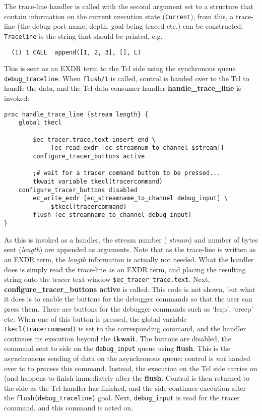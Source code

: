 The trace-line handler is called with the second argument set to a
structure that contain information on the current execution state
(\verb'Current'), from this, a trace-line (the debug port name, depth, goal
being traced etc.) can be constructed: \verb'Traceline' is the string that
should be printed, e.g.

\begin{verbatim}
  (1) 1 CALL  append([1, 2, 3], [], L)
\end{verbatim}
This is sent as an EXDR term to the Tcl side using the synchronous
queue \verb'debug_traceline'. When \verb'flush/1' is
called, control is handed over to the Tcl to handle the data, and the
Tcl data consumer handler {\bf handle_trace_line} is invoked:

\begin{verbatim}
proc handle_trace_line {stream length} {
	global tkecl

        $ec_tracer.trace.text insert end \
             [ec_read_exdr [ec_streamnum_to_channel $stream]]
        configure_tracer_buttons active

        ;# wait for a tracer command button to be pressed...
        tkwait variable tkecl(tracercommand)
	configure_tracer_buttons disabled
        ec_write_exdr [ec_streamname_to_channel debug_input] \
             $tkecl(tracercommand)
        flush [ec_streamname_to_channel debug_input]
}
\end{verbatim}

As this is invoked as a handler, the {\eclipse} stream number ({\it
stream}) and number of bytes sent ({\it length}) are appended as
arguments. Note that as the trace-line is written as an EXDR term, the {\it
length\/} information is actually not needed. What the handler does is
simply read the trace-line as an EXDR term, and placing the resulting
string onto the tracer text window \verb'$ec_tracer_trace.text'. Next, {\bf
configure_tracer_buttons active} is called. This code is not shown, but
what it does is to enable the buttons for the debugger commands so that the
user can press them. There are buttons for the debugger commands such as
`leap', `creep' etc. When one of this button is pressed, the global
variable \verb'tkecl(tracercommand)' is set to the corresponding command,
and the handler continues its execution beyond the {\bf tkwait}. The
buttons are disabled, the command sent to {\eclipse} side on the
\verb'debug_input' queue using {\bf flush}. This is the asynchronous
sending of data on the asynchronous queue:
control is {\it not\/} handed
over to {\eclipse} to process this command. Instead, the execution on the
Tcl side carries on (and happens to finish immediately after the {\bf
flush}. Control is then returned to the {\eclipse} side as the Tcl handler
has finished, and the {\eclipse} side continues execution after the
\verb'flush(debug_traceline)' goal. Next, \verb'debug_input' is read for
the tracer command, and this command is acted on.


